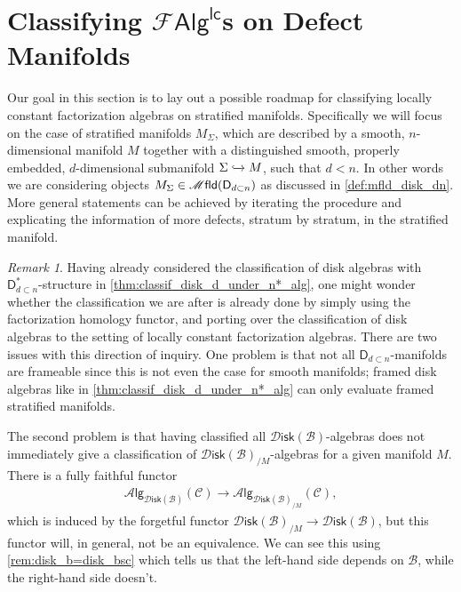 \documentclass[12pt,a4paper]{article}
\newcounter{counter} \numberwithin{counter}{section}
\theoremstyle{definition}
\theoremstyle{plain}
\theoremstyle{remark}
\newtheorem{remark}[counter]{Remark}
\newcommand{\catC}{\mathscr{C}}
\newcommand{\lcfa}{\mathscr{F} \mathsf{Alg}^{\mathsf{lc}}}
\newcommand{\mfld}[1][s]{%
    \ifx r#1\mathsf{Mfld}\else
    \ifx s#1\mathscr{M} \mathsf{fld}\else
    \mathrm{Illegal~option}%
    \fi\fi
}
\newcommand{\disk}{\mathscr{D} \mathsf{isk}}
\newcommand{\alg}[1]{\mathscr{A} \mathsf{lg}_{#1}}
\newcommand{\bstr}{\mathscr{B}}
\begin{document}
\section{Classifying \texorpdfstring{$\lcfa$}{FAlglc}s on Defect Manifolds}\label{ch:classif_defect_mfld}

Our goal in this section is to lay out a possible roadmap for classifying locally constant factorization algebras on stratified manifolds. Specifically we will focus on the case of stratified manifolds $M_{\Sigma}$, which are described by a smooth, $n$-dimensional manifold $M$ together with a distinguished smooth, properly embedded, $d$-dimensional submanifold $\Sigma \xhookrightarrow{} M$, such that $d < n$. In other words we are considering objects $M_{\Sigma} \in \mfld(\mathsf{D}_{d \subset n})$ as discussed in \cref{def:mfld_disk_dn}. More general statements can be achieved by iterating the procedure and explicating the information of more defects, stratum by stratum, in the stratified manifold.

\begin{remark}
    Having already considered the classification of disk algebras with $\mathsf{D}_{d \subset n}^*$-structure in \cref{thm:classif_disk_d_under_n*_alg}, one might wonder whether the classification we are after is already done by simply using the factorization homology functor, and porting over the classification of disk algebras to the setting of locally constant factorization algebras. There are two issues with this direction of inquiry. One problem is that not all $\mathsf{D}_{d \subset n}$-manifolds are frameable since this is not even the case for smooth manifolds; framed disk algebras like in \cref{thm:classif_disk_d_under_n*_alg} can only evaluate framed stratified manifolds.
    
    The second problem is that having classified all $\disk(\bstr)$-algebras does not immediately give a classification of $\disk(\bstr)_{/M}$-algebras for a given manifold $M$. There is a fully faithful functor
    \begin{align}
        \alg{\disk(\bstr)}(\catC) \xrightarrow{\quad} \alg{\disk(\bstr)_{/M}} (\catC),
    \end{align}
    which is induced by the forgetful functor $\disk(\bstr)_{/M} \rightarrow \disk(\bstr)$, but this functor will, in general, not be an equivalence. We can see this using \cref{rem:disk_b=disk_bsc} which tells us that the left-hand side depends on $\bstr$, while the right-hand side doesn't.

\end{remark}
\end{document}

